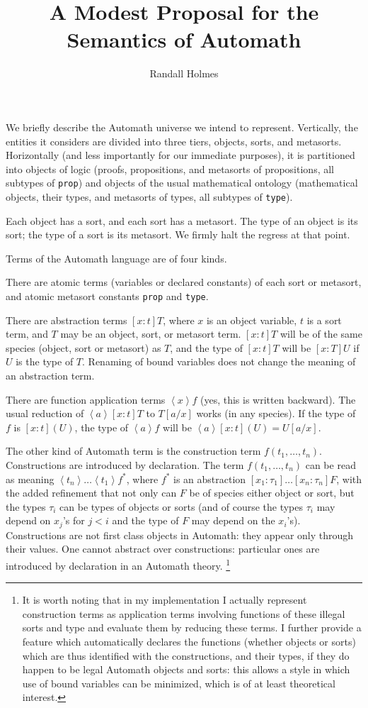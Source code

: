 \documentclass[12pt]{article}
\title{A Modest Proposal for the Semantics of Automath}
\author{Randall Holmes}
\begin{document}
\maketitle

We briefly describe the Automath universe we intend to represent.  Vertically, the entities it considers are divided into three tiers, objects, sorts, and metasorts.  Horizontally (and less importantly for our immediate purposes), it is partitioned into objects of logic (proofs, propositions, and metasorts of propositions, all subtypes of {\tt prop}) and objects of the usual mathematical ontology (mathematical objects, their types, and metasorts of types, all subtypes of {\tt type}).

Each object has a sort, and each sort has a metasort.  The type of an object is its sort;  the type of a sort is its metasort.  We firmly halt the regress at that point.

Terms of the Automath language are of four kinds.

There are atomic terms (variables or declared constants) of each sort or metasort, and atomic metasort constants {\tt prop} and {\tt type}.

There are abstraction terms $[x:t]T$, where $x$ is an object variable, $t$ is a sort term, and $T$ may be an object, sort, or metasort term.  $[x:t]T$ will be of the same species
(object, sort or metasort) as $T$, and the type of $[x:t]T$ will be $[x:T]U$ if $U$ is the type of $T$.  Renaming of bound variables does not change the meaning of an abstraction term.


There are function application terms $\left<x\right>f$ (yes, this is written backward).  The usual reduction of $\left<a\right>[x:t]T$ to $T[a/x]$ works (in any species).  If the type
of $f$ is $[x:t](U)$, the type of $\left<a\right>f$ will be $\left<a\right>[x:t](U) = U[a/x]$.

The other kind of Automath term is the construction term $f(t_1,\ldots,t_n)$.  Constructions are introduced by declaration.  The term $f(t_1,\ldots,t_n)$ can be read
as meaning $\left<t_n\right>\ldots \left<t_1\right>f^*$, where $f^*$ is an abstraction $[x_1:\tau_1]\ldots[x_n:\tau_n]F$, with the added refinement that not only can
$F$ be of species either object or sort, but the types $\tau_i$ can be types of objects or sorts (and of course the types $\tau_i$ may depend on $x_j$'s for $j<i$ and the type of $F$ may depend on the $x_i$'s).  Constructions are not first class objects in Automath:  they appear only through their
values.  One cannot abstract over constructions:  particular ones are introduced by declaration in an Automath theory.  \footnote{It is worth noting that in my implementation I actually represent construction terms as application terms involving functions of these illegal sorts and type and evaluate them by reducing these terms.  I further provide a feature which automatically declares the functions (whether objects or sorts) which are thus identified with the constructions, and their types, if they do happen to be legal Automath objects and sorts:  this allows a style in which use of bound variables can be minimized, which is of at least theoretical interest.}
\end{document}
